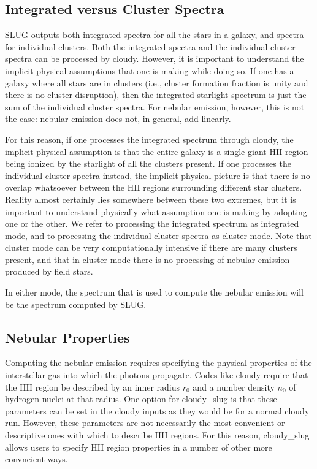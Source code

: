 \documentclass[letterpaper,10pt,english]{sphinxmanual}
\begin{document}
\subsection{Integrated versus Cluster Spectra}
\label{\detokenize{cloudy:sssec-cloudy-integrated-cluster}}\label{\detokenize{cloudy:integrated-versus-cluster-spectra}}
SLUG outputs both integrated spectra for all the stars in a galaxy,
and spectra for individual clusters. Both the integrated spectra and
the individual cluster spectra can be processed by cloudy. However, it
is important to understand the implicit physical assumptions that one
is making while doing so. If one has a galaxy where all stars are in
clusters (i.e., cluster formation fraction is unity and there is no
cluster disruption), then the integrated starlight spectrum is just
the sum of the individual cluster spectra. For nebular emission,
however, this is not the case: nebular emission does not, in general,
add linearly.

For this reason, if one processes the integrated spectrum through
cloudy, the implicit physical assumption is that the entire galaxy is
a single giant HII region being ionized by the starlight of all the
clusters present. If one processes the individual cluster spectra
instead, the implicit physical picture is that there is no overlap
whatsoever between the HII regions surrounding different star
clusters. Reality almost certainly lies somewhere between these two
extremes, but it is important to understand physically what assumption
one is making by adopting one or the other. We refer to processing the
integrated spectrum as integrated mode, and to processing the
individual cluster spectra as cluster mode. Note that cluster mode can
be very computationally intensive if there are many clusters present,
and that in cluster mode there is no processing of nebular emission
produced by field stars.

In either mode, the spectrum that is used to compute the nebular
emission will be the  spectrum computed
by SLUG.


\subsection{Nebular Properties}
\label{\detokenize{cloudy:nebular-properties}}\label{\detokenize{cloudy:sssec-cloudy-nebular-properties}}
Computing the nebular emission requires specifying the physical
properties of the interstellar gas into which the
photons propagate. Codes like cloudy require that the HII region be
described by an inner radius \(r_0\) and a number density
\(n_{0}\) of hydrogen nuclei at that radius. One option for
cloudy\_slug is that these parameters can be set in the cloudy inputs
as they would be for a normal cloudy run. However, these parameters
are not necessarily the most convenient or descriptive ones with which
to describe HII regions. For this reason, cloudy\_slug allows users to
specify HII region properties in a number of other more convneient
ways.
\end{document}
